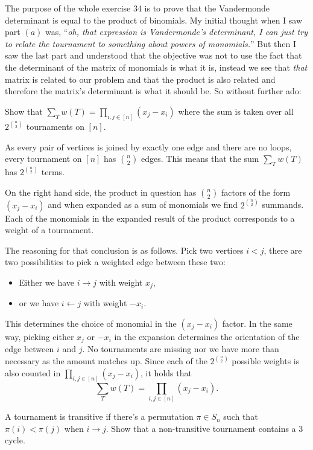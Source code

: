 \documentclass[12pt]{memoir}
\begin{document}
The purpose of the whole exercise 34 is to prove that the Vandermonde determinant is equal to the product of binomials. My initial thought when I saw part $(a)$ was, ``\emph{oh, that expression is Vandermonde's determinant, I can just try to relate the tournament to something about powers of monomials.}'' But then I saw the last part and understood that the objective was not to use the fact that the determinant of the matrix of monomials is what it is, instead we see that \emph{that} matrix is related to our problem and that the product is also related and therefore the matrix's determinant is what it should be. So without further ado:

\begin{Ej}
    Show that $\sum_Tw(T)=\prod_{i,j\in[n]}(x_j-x_i)$
    where the sum is taken over all $2^{\binom{n}{2}}$ tournaments on $[n]$.
 \end{Ej}

\begin{ptcbr}
As every pair of vertices is joined by exactly one edge and there are no loops, every tournament on $[n]$ has $\binom{n}{2}$ edges. This means that the sum $\sum_Tw(T)$ has $2^{\binom{n}{2}}$ terms.\par 
On the right hand side, the product in question has $\binom{n}{2}$ factors of the form $(x_j-x_i)$ and when expanded as a sum of monomials we find $2^{\binom{n}{2}}$ summands. Each of the monomials in the expanded result of the product corresponds to a weight of a tournament.\par 
The reasoning for that conclusion is as follows. Pick two vertices $i<j$, there are two possibilities to pick a weighted edge between these two:
\vspace*{-0.4em}
\begin{itemize}
    \itemsep=-0.4em
    \item Either we have $i\to j$ with weight $x_j$, 
    \item or we have $i\leftarrow j$ with weight $-x_i$.
\end{itemize}
This determines the choice of monomial in the $(x_j-x_i)$ factor. In the same way, picking either $x_j$ or $-x_i$ in the expansion determines the orientation of the edge between $i$ and $j$. No tournaments are missing nor we have more than necessary as the amount matches up. Since each of the $2^{\binom{n}{2}}$ possible weights is also counted in $\prod_{i,j\in[n]}(x_j-x_i)$, it holds that 
$$\sum_Tw(T)=\prod_{i,j\in[n]}(x_j-x_i).$$
\end{ptcbr}
\newpage
\begin{Ej}
    A tournament is transitive if there's a permutation $\pi\in S_n$ such that $\pi(i)<\pi(j)$ when $i\to j$. Show that a non-transitive tournament contains a 3 cycle. 
\end{Ej}
\end{document}
